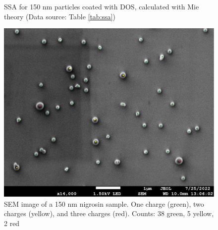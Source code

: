 \documentclass[12pt]{article}
\begin{document}
\begin{figure}[!h]
    \centering
    \caption{SSA for 150 nm particles coated with DOS, calculated with Mie theory (Data source: Table \ref{tab:ssa})}
    \label{fig:ssa}
\end{figure}

\begin{figure}[!h]
    \centering
    \includegraphics[width=\textwidth]{pgfdata/sem.png}
    \caption{SEM image of a 150 nm nigrosin sample. One charge (green), two charges (yellow), and three charges (red). Counts: 38 green, 5 yellow, 2 red}
    \label{fig:sem}
\end{figure}
\end{document}
